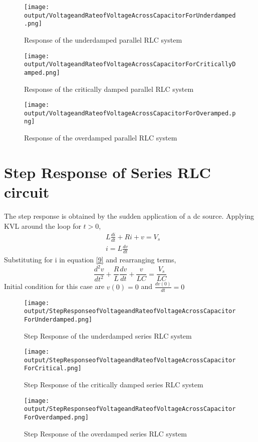 \documentclass[11pt,a4paper]{article}
\begin{document}
\begin{figure}[H]
\texttt{[image: output/VoltageandRateofVoltageAcrossCapacitorForUnderdamped.png]}
\caption{Response of the underdamped parallel RLC system }
\centering
\end{figure}

\begin{figure}[H]
\texttt{[image: output/VoltageandRateofVoltageAcrossCapacitorForCriticallyDamped.png]}
\caption{Response of the critically damped parallel RLC system }
\centering
\end{figure}

\begin{figure}[H]
\texttt{[image: output/VoltageandRateofVoltageAcrossCapacitorForOveramped.png]}
\caption{Response of the overdamped parallel RLC system }
\centering
\end{figure}

\section{Step Response of Series RLC circuit \cite{Alexander}}
The step response is obtained by the sudden application of a dc source. Applying KVL around the loop for $t>0$,
\begin{align}
 &L\frac{di}{dt} + Ri + v = V_s \label{9} \\
 &i = L\frac{dv}{dt}
\end{align}
 Substituting for i in equation \ref{9}  and rearranging terms,
 $$ \frac{d^2v}{dt^2} + \frac{R}{L}\frac{dv}{dt} + \frac{v}{LC} =  \frac{V_s}{LC} $$
 Initial condition for this case are $v(0) = 0$ and $\frac{dv(0)}{dt} = 0 $

\begin{figure}[H]
\texttt{[image: output/StepResponseofVoltageandRateofVoltageAcrossCapacitorForUnderdamped.png]}
\caption{Step Response of the underdamped series RLC system }
\centering
\end{figure}

\begin{figure}[H]
\texttt{[image: output/StepResponseofVoltageandRateofVoltageAcrossCapacitorForCritical.png]}
\caption{Step Response of the critically damped series RLC system }
\centering
\end{figure}

\begin{figure}[H]
\texttt{[image: output/StepResponseofVoltageandRateofVoltageAcrossCapacitorForOverdamped.png]}
\caption{Step Response of the overdamped series RLC system }
\centering
\end{figure} 
 
{}
 
 
\end{document}
